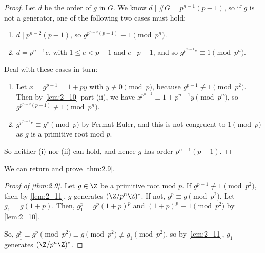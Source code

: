 \documentclass{article}
\begin{document}
\begin{proof}
    Let $d$ be the order of $g$ in $G$. We know $d \mid \#G = p^{n-1}(p-1)$, so if $g$ is not a generator, one of the following two cases must hold:

    \begin{enumerate}[label=(\roman*)]
        \item $d \mid p^{n-2} (p-1)$, so $g^{p^{n-2}(p-1)} \equiv 1 \pmod{p^n}$.
        \item $d = p^{n-1} e$, with $1 \leq e < p-1$ and $e \mid p-1$, and so $g^{p^{n-1} e} \equiv 1 \pmod{p^n}$.
    \end{enumerate}
    Deal with these cases in turn:

    \begin{enumerate}[label=(\roman*)]
        \item Let $x = g^{p-1} = 1+py$ with $y \not\equiv 0 \pmod{p}$, because $g^{p-1} \not\equiv 1 \pmod{p^2}$.
            Then by \cref{lem:2_10} part (ii), we have $x^{p^{n-2}} \equiv 1 + p^{n-1} y \pmod{p^n}$, so $g^{p^{n-2}(p-1)} \not\equiv 1 \pmod{p^n}$.

        \item $g^{p^{n-1}e} \equiv g^e \pmod{p}$ by Fermat-Euler, and this is not congruent to $1 \pmod{p}$ as $g$ is a primitive root mod $p$.
    \end{enumerate}

    So neither (i) nor (ii) can hold, and hence $g$ has order $p^{n-1}(p-1)$.
\end{proof}

We can return and prove \cref{thm:2.9}.

\begin{proof}[Proof of \cref{thm:2.9}\label{pf:2.9}]
    Let $g \in \Z$ be a primitive root mod $p$. If $g^{p-1} \not\equiv 1 \pmod{p^2}$, then by \cref{lem:2_11}, $g$ generates $(\Z/p^n \Z)^*$.
    If not, $g^p \equiv g \pmod{p^2}$. Let $g_1 = g(1 + p)$.
    Then, $g_1^p = g^p (1+p)^p$ and $(1+p)^p \equiv 1 \pmod{p^2}$ by \cref{lem:2_10}.

    So, $g_1^p \equiv g^p \pmod{p^2} \equiv g \pmod{p^2} \not\equiv g_1 \pmod{p^2}$, so by \cref{lem:2_11}, $g_1$ generates $(\Z/p^n \Z)^*$.
\end{proof}
\end{document}
